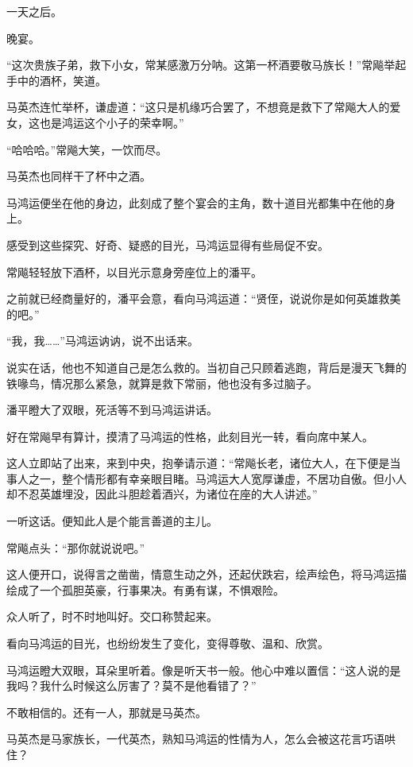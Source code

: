 
\begin{this_body}

一天之后。

晚宴。

“这次贵族子弟，救下小女，常某感激万分呐。这第一杯酒要敬马族长！”常飚举起手中的酒杯，笑道。

马英杰连忙举杯，谦虚道：“这只是机缘巧合罢了，不想竟是救下了常飚大人的爱女，这也是鸿运这个小子的荣幸啊。”

“哈哈哈。”常飚大笑，一饮而尽。

马英杰也同样干了杯中之酒。

马鸿运便坐在他的身边，此刻成了整个宴会的主角，数十道目光都集中在他的身上。

感受到这些探究、好奇、疑惑的目光，马鸿运显得有些局促不安。

常飚轻轻放下酒杯，以目光示意身旁座位上的潘平。

之前就已经商量好的，潘平会意，看向马鸿运道：“贤侄，说说你是如何英雄救美的吧。”

“我，我……”马鸿运讷讷，说不出话来。

说实在话，他也不知道自己是怎么救的。当初自己只顾着逃跑，背后是漫天飞舞的铁喙鸟，情况那么紧急，就算是救下常丽，他也没有多过脑子。

潘平瞪大了双眼，死活等不到马鸿运讲话。

好在常飚早有算计，摸清了马鸿运的性格，此刻目光一转，看向席中某人。

这人立即站了出来，来到中央，抱拳请示道：“常飚长老，诸位大人，在下便是当事人之一，整个情形都有幸亲眼目睹。马鸿运大人宽厚谦虚，不居功自傲。但小人却不忍英雄埋没，因此斗胆趁着酒兴，为诸位在座的大人讲述。”

一听这话。便知此人是个能言善道的主儿。

常飚点头：“那你就说说吧。”

这人便开口，说得言之凿凿，情意生动之外，还起伏跌宕，绘声绘色，将马鸿运描绘成了一个孤胆英豪，行事果决。有勇有谋，不惧艰险。

众人听了，时不时地叫好。交口称赞起来。

看向马鸿运的目光，也纷纷发生了变化，变得尊敬、温和、欣赏。

马鸿运瞪大双眼，耳朵里听着。像是听天书一般。他心中难以置信：“这人说的是我吗？我什么时候这么厉害了？莫不是他看错了？”

不敢相信的。还有一人，那就是马英杰。

马英杰是马家族长，一代英杰，熟知马鸿运的性情为人，怎么会被这花言巧语哄住？


\end{this_body}
